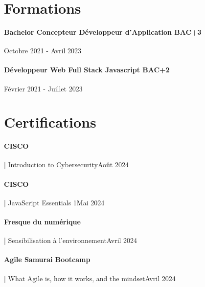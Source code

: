 \documentclass{article}
\begin{document}
\vspace{2ex}
\hrulefill
\section*{Formations}
\paragraph{Bachelor Concepteur Développeur d’Application BAC+3}\hspace*{\fill}Octobre 2021 - Avril 2023

\paragraph{Développeur Web Full Stack Javascript BAC+2}\hspace*{\fill}Février 2021 - Juillet 2023

\vspace{2ex}
\hrulefill
\section*{Certifications}

\paragraph{CISCO} | Introduction to Cybersecurity\hspace*{\fill}Août 2024
\paragraph{CISCO} | JavaScript Essentials 1\hspace*{\fill}Mai 2024
\paragraph{Fresque du numérique} | Sensibilisation à l’environnement\hspace*{\fill}Avril 2024
\paragraph{Agile Samurai Bootcamp} | What Agile is, how it works, and the mindset\hspace*{\fill}Avril 2024
\end{document}
